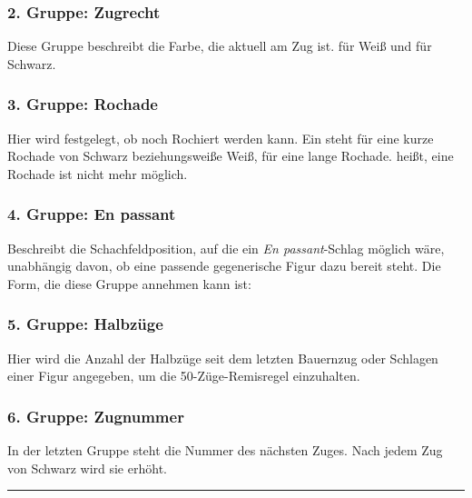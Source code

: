 \subsubsection{2. Gruppe: Zugrecht}


Diese Gruppe beschreibt die Farbe, die aktuell am Zug ist.  für Weiß und
 für Schwarz.

\subsubsection{3. Gruppe: Rochade}


Hier wird festgelegt, ob noch Rochiert werden kann. Ein  steht für
eine kurze Rochade von Schwarz beziehungsweiße Weiß,  für eine lange
Rochade. \code{-} heißt, eine Rochade ist nicht mehr möglich.

\subsubsection{4. Gruppe: En passant}

\code{-}

Beschreibt die Schachfeldposition, auf die ein \emph{En passant}-Schlag möglich
wäre, unabhängig davon, ob eine passende gegenerische Figur dazu bereit steht.
Die Form, die diese Gruppe annehmen kann ist:\\ 

\subsubsection{5. Gruppe: Halbzüge}


Hier wird die Anzahl der Halbzüge seit dem letzten Bauernzug oder Schlagen einer
Figur angegeben, um die 50-Züge-Remisregel einzuhalten.

\subsubsection{6. Gruppe: Zugnummer}


In der letzten Gruppe steht die Nummer des nächsten Zuges. Nach jedem Zug von
Schwarz wird sie erhöht.

\rule{\textwidth}{0.5pt}

